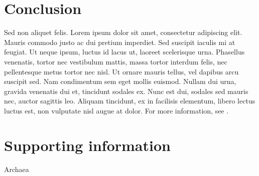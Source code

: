 \documentclass[10pt,letterpaper]{article}
\begin{document}
\section*{Conclusion}


Sed non aliquet felis. Lorem ipsum dolor sit amet, consectetur adipiscing elit. Mauris commodo justo ac dui pretium imperdiet. Sed suscipit iaculis mi at feugiat. Ut neque ipsum, luctus id lacus ut, laoreet scelerisque urna. Phasellus venenatis, tortor nec vestibulum mattis, massa tortor interdum felis, nec pellentesque metus tortor nec nisl. Ut ornare mauris tellus, vel dapibus arcu suscipit sed. Nam condimentum sem eget mollis euismod. Nullam dui urna, gravida venenatis dui et, tincidunt sodales ex. Nunc est dui, sodales sed mauris nec, auctor sagittis leo. Aliquam tincidunt, ex in facilisis elementum, libero lectus luctus est, non vulputate nisl augue at dolor. For more information, see .

\section*{Supporting information}

Archaea
\end{document}
